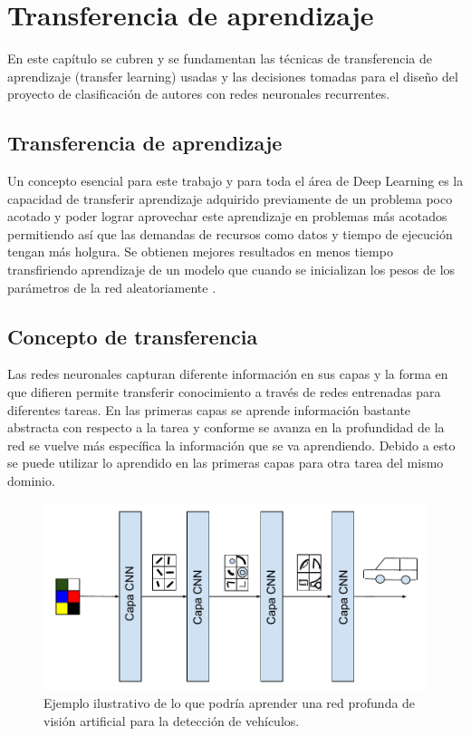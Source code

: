 
\chapter{Transferencia de aprendizaje} %

\label{Chapter3} %

En este capítulo se cubren y se fundamentan las técnicas de transferencia de aprendizaje (transfer learning) usadas y las decisiones tomadas para el diseño del proyecto de clasificación de autores con redes neuronales recurrentes.

\section{Transferencia de aprendizaje} %

Un concepto esencial para este trabajo y para toda el área de Deep Learning es la capacidad de transferir aprendizaje adquirido previamente de un problema poco acotado y poder lograr aprovechar este aprendizaje en problemas más acotados permitiendo así que las demandas de recursos como datos y tiempo de ejecución tengan más holgura. Se obtienen mejores resultados en menos tiempo transfiriendo aprendizaje de un modelo que cuando se inicializan los pesos de los parámetros de la red aleatoriamente \parencite{Erhan:2010:WUP}.

\section{Concepto de transferencia}

Las redes neuronales capturan diferente información en sus capas \parencite{yosinski:2014, zeiler2014visualizing} y la forma en que difieren permite transferir conocimiento a través de redes entrenadas para diferentes tareas. En las primeras capas se aprende información bastante abstracta con respecto a la tarea y conforme se avanza en la profundidad de la red se vuelve más específica la información que se va aprendiendo. Debido a esto se puede utilizar lo aprendido en las primeras capas para otra tarea del mismo dominio.

\begin{figure}
\includegraphics[scale=1]{Figures/learnbylayer.pdf}
\caption{Ejemplo ilustrativo de lo que podría aprender una red profunda de visión artificial para la detección de vehículos.}
\label{fig:learnbylayer}
\end{figure}

